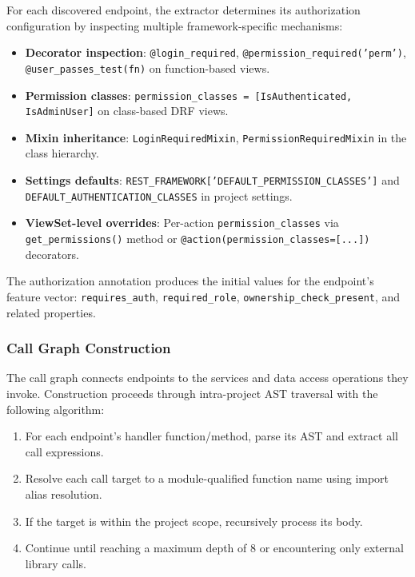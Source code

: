 For each discovered endpoint, the extractor determines its authorization configuration by inspecting multiple framework-specific mechanisms:

\begin{itemize}
    \item \textbf{Decorator inspection}: \texttt{@login\_required}, \texttt{@permission\_required('perm')}, \texttt{@user\_passes\_test(fn)} on function-based views.
    \item \textbf{Permission classes}: \texttt{permission\_classes = [IsAuthenticated, IsAdminUser]} on class-based DRF views.
    \item \textbf{Mixin inheritance}: \texttt{LoginRequiredMixin}, \texttt{PermissionRequiredMixin} in the class hierarchy.
    \item \textbf{Settings defaults}: \texttt{REST\_FRAMEWORK['DEFAULT\_PERMISSION\_CLASSES']} and \texttt{DEFAULT\_AUTHENTICATION\_CLASSES} in project settings.
    \item \textbf{ViewSet-level overrides}: Per-action \texttt{permission\_classes} via \texttt{get\_permissions()} method or \texttt{@action(permission\_classes=[...])} decorators.
\end{itemize}

The authorization annotation produces the initial values for the endpoint's feature vector: \texttt{requires\_auth}, \texttt{required\_role}, \texttt{ownership\_check\_present}, and related properties.

\subsubsection{Call Graph Construction}

The call graph connects endpoints to the services and data access operations they invoke. Construction proceeds through intra-project AST traversal with the following algorithm:

\begin{enumerate}
    \item For each endpoint's handler function/method, parse its AST and extract all call expressions.
    \item Resolve each call target to a module-qualified function name using import alias resolution.
    \item If the target is within the project scope, recursively process its body.
    \item Continue until reaching a maximum depth of 8 or encountering only external library calls.
\end{enumerate}

